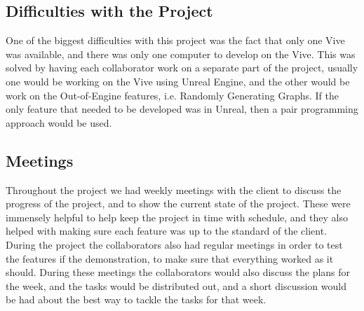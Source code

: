 \subsection{Difficulties with the Project}
	One of the biggest difficulties with this project was the fact that only one Vive was available, and there was only one computer to develop on the Vive. This was solved by having each collaborator work on a separate part of the project, usually one would be working on the Vive using Unreal Engine, and the other would be work on the Out-of-Engine features, i.e. Randomly Generating Graphs. If the only feature that needed to be developed was in Unreal, then a pair programming approach would be used.
	
\subsection{Meetings}
	Throughout the project we had weekly meetings with the client to discuss the progress of the project, and to show the current state of the project. These were immensely helpful to help keep the project in time with schedule, and they also helped with making sure each feature was up to the standard of the client.
	During the project the collaborators also had regular meetings in order to test the features if the demonstration, to make sure that everything worked as it should. During these meetings the collaborators would also discuss the plans for the week, and the tasks would be distributed out, and a short discussion would be had about the best way to tackle the tasks for that week.